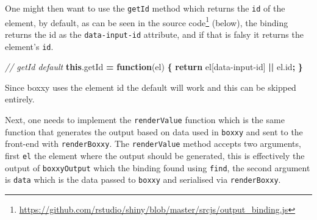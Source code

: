 \documentclass[
  10pt,
]{krantz}
\makeatletter
\newenvironment{Shaded}{\begin{snugshade}}{\end{snugshade}}
\newcommand{\AttributeTok}[1]{\textcolor[rgb]{0.61,0.61,0.61}{#1}}
\newcommand{\CommentTok}[1]{\textcolor[rgb]{0.37,0.37,0.37}{\textit{#1}}}
\newcommand{\ControlFlowTok}[1]{\textcolor[rgb]{0.27,0.27,0.27}{\textbf{#1}}}
\newcommand{\DataTypeTok}[1]{\textcolor[rgb]{0.27,0.27,0.27}{#1}}
\newcommand{\KeywordTok}[1]{\textcolor[rgb]{0.27,0.27,0.27}{\textbf{#1}}}
\newcommand{\NormalTok}[1]{#1}
\newcommand{\OperatorTok}[1]{\textcolor[rgb]{0.43,0.43,0.43}{\textbf{#1}}}
\newcommand{\StringTok}[1]{\textcolor[rgb]{0.5,0.5,0.5}{#1}}
\newcommand{\VariableTok}[1]{\textcolor[rgb]{0,0,0}{#1}}
\renewcommand{\href}[2]{#2\footnote{\url{#1}}}
\newenvironment{kframe}{%
\medskip{}
\setlength{\fboxsep}{.8em}
 \def\at@end@of@kframe{}%
 \ifinner\ifhmode%
  \def\at@end@of@kframe{\end{minipage}}%
  \begin{minipage}{\columnwidth}%
 \fi\fi%
 \def\FrameCommand##1{\hskip\@totalleftmargin \hskip-\fboxsep
 \colorbox{shadecolor}{##1}\hskip-\fboxsep
     \hskip-\linewidth \hskip-\@totalleftmargin \hskip\columnwidth}%
 \MakeFramed {\advance\hsize-\width
   \@totalleftmargin\z@ \linewidth\hsize
   \@setminipage}}%
 {\par\unskip\endMakeFramed%
 \at@end@of@kframe}
\renewenvironment{Shaded}{\begin{kframe}}{\end{kframe}}
\makeatother
\begin{document}
\begin{Shaded}
\end{Shaded}

One might then want to use the \texttt{getId} method which returns the \texttt{id} of the element, by default, as can be seen in the \href{https://github.com/rstudio/shiny/blob/master/srcjs/output_binding.js}{source code} (below), the binding returns the id as the \texttt{data-input-id} attribute, and if that is falsy it returns the element's \texttt{id}.

\begin{Shaded}
\begin{Highlighting}[]
\CommentTok{// getId default}
\KeywordTok{this}\NormalTok{.}\AttributeTok{getId} \OperatorTok{=} \KeywordTok{function}\NormalTok{(el) }\OperatorTok{\{}
  \ControlFlowTok{return}\NormalTok{ el[}\StringTok{\textquotesingle{}data{-}input{-}id\textquotesingle{}}\NormalTok{] }\OperatorTok{||} \VariableTok{el}\NormalTok{.}\AttributeTok{id}\OperatorTok{;}
\OperatorTok{\}}
\end{Highlighting}
\end{Shaded}

Since boxxy uses the element id the default will work and this can be skipped entirely.

Next, one needs to implement the \texttt{renderValue} function which is the same function that generates the output based on data used in \texttt{boxxy} and sent to the front-end with \texttt{renderBoxxy}. The \texttt{renderValue} method accepts two arguments, first \texttt{el} the element where the output should be generated, this is effectively the output of \texttt{boxxyOutput} which the binding found using \texttt{find}, the second argument is \texttt{data} which is the data passed to \texttt{boxxy} and serialised via \texttt{renderBoxxy}.
\end{document}
